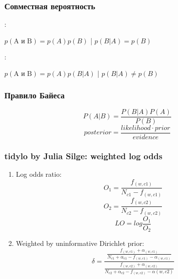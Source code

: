 \documentclass[svgnames]{beamer}
\begin{document}
\begin{frame}
  \frametitle{Совместная вероятность}
  :

    $p(\text{A и B}) = p(A)p(B)$ \quad{} | $p(B|A) = p(B)$

    \bigskip

  \pause
  :

   $p(\text{A и B}) = p(A)p(B|A)$ \quad{} | $p(B|A) \neq p(B)$
\end{frame}

\begin{frame}
  \frametitle{Правило Байеса}
  \begin{equation}
    P(A|B) = \frac{P(B|A)P(A)}{P(B)}
  \end{equation}
  \pause
  \begin{equation}
    posterior = \frac{likelihood \cdot prior}{evidence}
  \end{equation}  
\end{frame}


\begin{frame}
  \frametitle{tidylo by Julia Silge: weighted log odds}
  \begin{enumerate}
  \item Log odds ratio:
    $$
    O_1 = \frac{f_{(w,c1)}}{N_{c1}-f_{(w,c1)}}
    $$
    $$
    O_2 = \frac{f_{(w,c2)}}{N_{c2}-f_{(w,c2)}}
    $$
    $$
    LO = log \frac{O_1}{O_2}
    $$
  \item Weighted by uninformative Dirichlet prior:
    $$
    \delta =
    \frac{\frac{f_{(w,c1)}+\alpha_{(w,c1)}}{N_{c1}+\alpha_{c1}-f_{(w,c1)}-\alpha_{(w,c1)}}}{\frac{f_{(w,c2)}+\alpha_{(w,c2)}}{N_{c2}+\alpha_{c2}-f_{(w,c2)}-\alpha{(w,c2)}}}
    $$
  \end{enumerate}
\end{frame}
\end{document}
